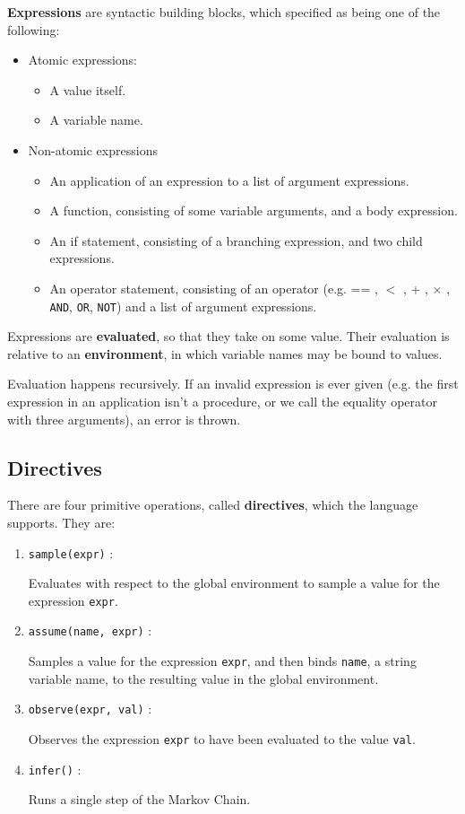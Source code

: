 \documentclass[11pt]{article}
\begin{document}
{\bf Expressions} are syntactic building blocks, which specified as being one of the following:
\begin{itemize}
\item Atomic expressions:
\begin{itemize}
\item A value itself.
\item A variable name.
\end{itemize}
\item Non-atomic expressions
\begin{itemize}
\item An application of an expression to a list of argument expressions.
\item A function, consisting of some variable arguments, and a body expression.
\item An if statement, consisting of a branching expression, and two child expressions.
\item An operator statement, consisting of an operator (e.g. == , $<$ , + , $\times$ , {\tt AND}, {\tt OR}, {\tt NOT}) and a list of argument expressions.
\end{itemize}
\end{itemize}

Expressions are {\bf evaluated}, so that they take on some value.  Their evaluation is relative to an {\bf environment}, in which variable names may be bound to values.  

Evaluation happens recursively.  If an invalid expression is ever given (e.g. the first expression in an application isn't a procedure, or we call the equality operator with three arguments), an error is thrown.  

\subsection{Directives}

There are four primitive operations, called {\bf directives}, which the language supports.  They are:

\begin{enumerate}
\item {\tt sample(expr)} : 

Evaluates with respect to the global environment to sample a value for the expression {\tt expr}.

\item {\tt assume(name, expr)} : 

Samples a value for the expression {\tt expr}, and then binds {\tt name}, a string variable name, to the resulting value in the global environment.

\item {\tt observe(expr, val)} : 

Observes the expression {\tt expr} to have been evaluated to the value {\tt val}.

\item {\tt infer()} : 

Runs a single step of the Markov Chain.  

\end{enumerate}
\end{document}
